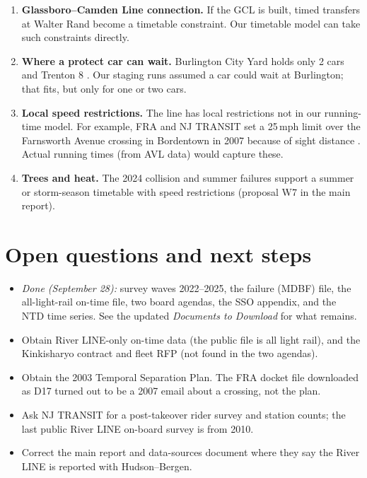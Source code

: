 \documentclass[11pt]{article}
\begin{document}
\begin{enumerate}
\item \textbf{Glassboro--Camden Line connection.} If the GCL is built, timed transfers at Walter Rand become a timetable constraint. Our timetable model can take such constraints directly.
\item \textbf{Where a protect car can wait.} Burlington City Yard holds only 2 cars and Trenton 8 \citep{nj_sso2021}. Our staging runs assumed a car could wait at Burlington; that fits, but only for one or two cars.
\item \textbf{Local speed restrictions.} The line has local restrictions not in our running-time model. For example, FRA and NJ TRANSIT set a 25\,mph limit over the Farnsworth Avenue crossing in Bordentown in 2007 because of sight distance \citep{fra2007farnsworth}. Actual running times (from AVL data) would capture these.
\item \textbf{Trees and heat.} The 2024 collision and summer failures \citep{ntsb2025,njt2024interim} support a summer or storm-season timetable with speed restrictions (proposal W7 in the main report).
\end{enumerate}

\section{Open questions and next steps}
\begin{itemize}
\item \emph{Done (September 28):} survey waves 2022--2025, the failure (MDBF) file, the all-light-rail on-time file, two board agendas, the SSO appendix, and the NTD time series. See the updated \emph{Documents to Download} for what remains.
\item Obtain River LINE-only on-time data (the public file is all light rail), and the Kinkisharyo contract and fleet RFP (not found in the two agendas).
\item Obtain the 2003 Temporal Separation Plan. The FRA docket file downloaded as D17 turned out to be a 2007 email about a crossing, not the plan.
\item Ask NJ TRANSIT for a post-takeover rider survey and station counts; the last public River LINE on-board survey is from 2010.
\item Correct the main report and data-sources document where they say the River LINE is reported with Hudson--Bergen.
\end{itemize}
\end{document}
